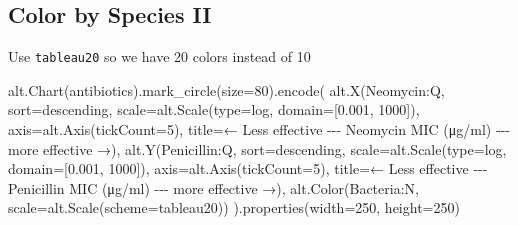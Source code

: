 \documentclass[
  letterpaper,
  DIV=11,
  numbers=noendperiod]{scrartcl}
\newenvironment{Shaded}{\begin{snugshade}}{\end{snugshade}}
\newcommand{\BuiltInTok}[1]{\textcolor[rgb]{0.00,0.23,0.31}{#1}}
\newcommand{\DecValTok}[1]{\textcolor[rgb]{0.68,0.00,0.00}{#1}}
\newcommand{\FloatTok}[1]{\textcolor[rgb]{0.68,0.00,0.00}{#1}}
\newcommand{\NormalTok}[1]{\textcolor[rgb]{0.00,0.23,0.31}{#1}}
\newcommand{\OperatorTok}[1]{\textcolor[rgb]{0.37,0.37,0.37}{#1}}
\newcommand{\StringTok}[1]{\textcolor[rgb]{0.13,0.47,0.30}{#1}}
\begin{document}
\subsection{Color by Species II}\label{color-by-species-ii}

Use \texttt{tableau20} so we have 20 colors instead of 10

\begin{Shaded}
\begin{Highlighting}[]
\NormalTok{alt.Chart(antibiotics).mark\_circle(size}\OperatorTok{=}\DecValTok{80}\NormalTok{).encode(}
\NormalTok{    alt.X(}\StringTok{\textquotesingle{}Neomycin:Q\textquotesingle{}}\NormalTok{,}
\NormalTok{          sort}\OperatorTok{=}\StringTok{\textquotesingle{}descending\textquotesingle{}}\NormalTok{,}
\NormalTok{          scale}\OperatorTok{=}\NormalTok{alt.Scale(}\BuiltInTok{type}\OperatorTok{=}\StringTok{\textquotesingle{}log\textquotesingle{}}\NormalTok{, domain}\OperatorTok{=}\NormalTok{[}\FloatTok{0.001}\NormalTok{, }\DecValTok{1000}\NormalTok{]),}
\NormalTok{          axis}\OperatorTok{=}\NormalTok{alt.Axis(tickCount}\OperatorTok{=}\DecValTok{5}\NormalTok{),}
\NormalTok{          title}\OperatorTok{=}\StringTok{\textquotesingle{}← Less effective {-}{-}{-} Neomycin MIC (μg/ml) {-}{-}{-} more effective →\textquotesingle{}}\NormalTok{),}
\NormalTok{    alt.Y(}\StringTok{\textquotesingle{}Penicillin:Q\textquotesingle{}}\NormalTok{,}
\NormalTok{          sort}\OperatorTok{=}\StringTok{\textquotesingle{}descending\textquotesingle{}}\NormalTok{,}
\NormalTok{          scale}\OperatorTok{=}\NormalTok{alt.Scale(}\BuiltInTok{type}\OperatorTok{=}\StringTok{\textquotesingle{}log\textquotesingle{}}\NormalTok{, domain}\OperatorTok{=}\NormalTok{[}\FloatTok{0.001}\NormalTok{, }\DecValTok{1000}\NormalTok{]),}
\NormalTok{          axis}\OperatorTok{=}\NormalTok{alt.Axis(tickCount}\OperatorTok{=}\DecValTok{5}\NormalTok{),}
\NormalTok{          title}\OperatorTok{=}\StringTok{\textquotesingle{}← Less effective {-}{-}{-} Penicillin MIC (μg/ml) {-}{-}{-} more effective →\textquotesingle{}}\NormalTok{),}
\NormalTok{    alt.Color(}\StringTok{\textquotesingle{}Bacteria:N\textquotesingle{}}\NormalTok{,}
\NormalTok{          scale}\OperatorTok{=}\NormalTok{alt.Scale(scheme}\OperatorTok{=}\StringTok{\textquotesingle{}tableau20\textquotesingle{}}\NormalTok{))}
\NormalTok{).properties(width}\OperatorTok{=}\DecValTok{250}\NormalTok{, height}\OperatorTok{=}\DecValTok{250}\NormalTok{)}
\end{Highlighting}
\end{Shaded}
\end{document}
